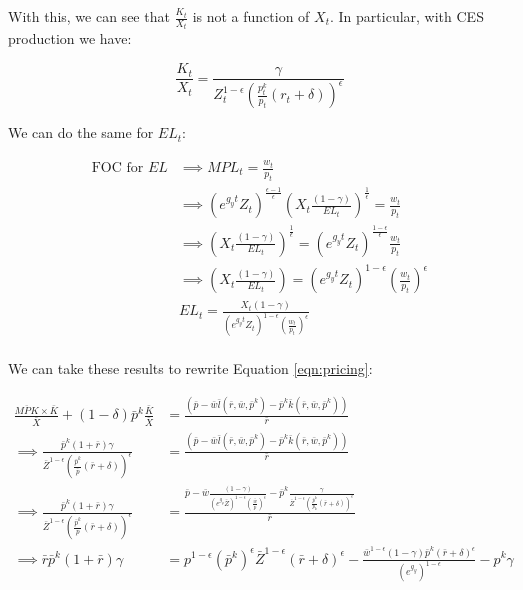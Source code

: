 \documentclass[letterpaper,12pt]{article}
\theoremstyle{definition}
\begin{document}
With this, we can see that $\frac{K_{t}}{X_{t}}$ is not a function of $X_{t}$. In particular, with CES production we have: 

\begin{equation}
\frac{K_{t}}{X_{t}} = \frac{\gamma}{Z_{t}^{1-\epsilon}\left(\frac{p^{k}_{t}}{p_{t}}(r_{t}+\delta)\right)^{\epsilon}}
\end{equation} 

We can do the same for $EL_{t}$:

\begin{equation}
\begin{split}
\text{FOC for $EL$}& \implies MPL_{t} = \frac{w_{t}}{p_{t}}\\
& \implies \left(e^{g_{y}t}Z_{t}\right)^{\frac{\epsilon-1}{\epsilon}}\left(X_{t}\frac{(1-\gamma)}{EL_{t}}\right)^{\frac{1}{\epsilon}} = \frac{w_{t}}{p_{t}} \\
& \implies \left(X_{t}\frac{(1-\gamma)}{EL_{t}}\right)^{\frac{1}{\epsilon}} =  \left(e^{g_{y}t}Z_{t}\right)^{\frac{1-\epsilon}{\epsilon}}\frac{w_{t}}{p_{t}} \\
& \implies \left(X_{t}\frac{(1-\gamma)}{EL_{t}}\right)=  \left(e^{g_{y}t}Z_{t}\right)^{1-\epsilon}\left(\frac{w_{t}}{p_{t}}\right)^{\epsilon} \\
& EL_{t}=  \frac{X_{t}(1-\gamma)}{\left(e^{g_{y}t}Z_{t}\right)^{1-\epsilon}\left(\frac{w_{t}}{p_{t}}\right)^{\epsilon}} \\
\end{split}
\end{equation}


We can take these results to rewrite Equation \ref{eqn:pricing}:

\begin{equation}
\label{eqn:pricing_final}
\begin{split}
 \frac{\overline{MPK} \times \bar{K}}{\bar{X}} + (1-\delta)\bar{p}^{k}\frac{\bar{K}}{\bar{X}} & =  \frac{\left(\bar{p} - \bar{w}\bar{l}(\bar{r},\bar{w},\bar{p}^{k}) - \bar{p}^{k}\bar{k}(\bar{r},\bar{w},\bar{p}^{k})\right)}{\bar{r}} \\
 \implies \frac{ \bar{p}^{k}(1+\bar{r})\gamma}{\bar{Z}^{1-\epsilon}\left(\frac{\bar{p}^{k}}{\bar{p}}(\bar{r}+\delta)\right)^{\epsilon}} & = \frac{\left(\bar{p} - \bar{w}\bar{l}(\bar{r},\bar{w},\bar{p}^{k}) - \bar{p}^{k}\bar{k}(\bar{r},\bar{w},\bar{p}^{k})\right)}{\bar{r}}  \\
  \implies \frac{ \bar{p}^{k}(1+\bar{r})\gamma}{\bar{Z}^{1-\epsilon}\left(\frac{\bar{p}^{k}}{\bar{p}}(\bar{r}+\delta)\right)^{\epsilon}} & = \frac{\bar{p} - \bar{w} \frac{(1-\gamma)}{\left(e^{g_{y}}\bar{Z}\right)^{1-\epsilon}\left(\frac{\bar{w}}{\bar{p}}\right)^{\epsilon}}  - \bar{p}^{k}\frac{\gamma}{\bar{Z}^{1-\epsilon}\left(\frac{\bar{p}^{k}}{p_{k}}(\bar{r}+\delta)\right)^{\epsilon}}}{\bar{r}} \\
  \implies \bar{r}\bar{p}^{k}(1+\bar{r})\gamma & = p^{1-\epsilon}\left(\bar{p}^{k}\right)^{\epsilon}\bar{Z}^{1-\epsilon}(\bar{r}+\delta)^{\epsilon} - \frac{\bar{w}^{1-\epsilon}(1-\gamma)\bar{p}^{k}(\bar{r}+\delta)^{\epsilon}}{\left(e^{g_{y}}\right)^{1-\epsilon}} - p^{k}\gamma
  \end{split}
\end{equation} 
\end{document}
